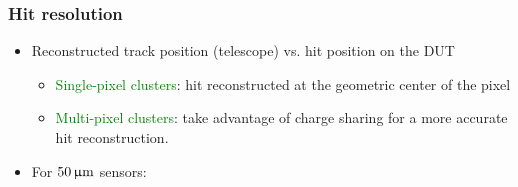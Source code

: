 \begin{frame}
  \frametitle{Hit resolution}

  \begin{itemize}
  \item Reconstructed track position (telescope) vs. hit position on
    the DUT
    \begin{itemize}
    \item \textcolor{Green}{Single-pixel clusters}: hit
      reconstructed at the geometric center of the pixel
    \item \textcolor{Green}{Multi-pixel clusters}: take advantage of
      charge sharing for a more accurate hit reconstruction.
    \end{itemize}
  \item For $50\,\upmu\mathrm{m}$ sensors:
  \end{itemize}

  \begin{columns}[t]
    \centering
\end{columns}
\end{frame}
